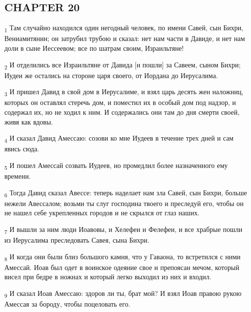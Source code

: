 \subsection{CHAPTER 20}
\begin{tcolorbox}
\textsubscript{1} Там случайно находился один негодный человек, по имени Савей, сын Бихри, Вениамитянин; он затрубил трубою и сказал: нет нам части в Давиде, и нет нам доли в сыне Иессеевом; все по шатрам своим, Израильтяне!
\end{tcolorbox}
\begin{tcolorbox}
\textsubscript{2} И отделились все Израильтяне от Давида [и пошли] за Савеем, сыном Бихри; Иудеи же остались на стороне царя своего, от Иордана до Иерусалима.
\end{tcolorbox}
\begin{tcolorbox}
\textsubscript{3} И пришел Давид в свой дом в Иерусалиме, и взял царь десять жен наложниц, которых он оставлял стеречь дом, и поместил их в особый дом под надзор, и содержал их, но не ходил к ним. И содержались они там до дня смерти своей, живя как вдовы.
\end{tcolorbox}
\begin{tcolorbox}
\textsubscript{4} И сказал Давид Амессаю: созови ко мне Иудеев в течение трех дней и сам явись сюда.
\end{tcolorbox}
\begin{tcolorbox}
\textsubscript{5} И пошел Амессай созвать Иудеев, но промедлил более назначенного ему времени.
\end{tcolorbox}
\begin{tcolorbox}
\textsubscript{6} Тогда Давид сказал Авессе: теперь наделает нам зла Савей, сын Бихри, больше нежели Авессалом; возьми ты слуг господина твоего и преследуй его, чтобы он не нашел себе укрепленных городов и не скрылся от глаз наших.
\end{tcolorbox}
\begin{tcolorbox}
\textsubscript{7} И вышли за ним люди Иоавовы, и Хелефеи и Фелефеи, и все храбрые пошли из Иерусалима преследовать Савея, сына Бихри.
\end{tcolorbox}
\begin{tcolorbox}
\textsubscript{8} И когда они были близ большого камня, что у Гаваона, то встретился с ними Амессай. Иоав был одет в воинское одеяние свое и препоясан мечом, который висел при бедре в ножнах и который легко выходил из них и входил.
\end{tcolorbox}
\begin{tcolorbox}
\textsubscript{9} И сказал Иоав Амессаю: здоров ли ты, брат мой? И взял Иоав правою рукою Амессая за бороду, чтобы поцеловать его.
\end{tcolorbox}
